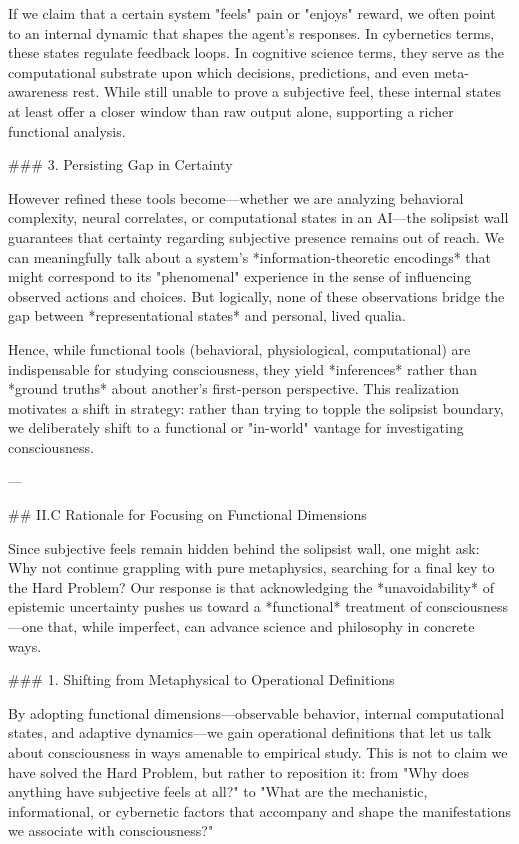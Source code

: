 If we claim that a certain system "feels" pain or "enjoys" reward, we often point to an internal dynamic that shapes the agent's responses. In cybernetics terms, these states regulate feedback loops. In cognitive science terms, they serve as the computational substrate upon which decisions, predictions, and even meta-awareness rest. While still unable to prove a subjective feel, these internal states at least offer a closer window than raw output alone, supporting a richer functional analysis.

### 3. Persisting Gap in Certainty

However refined these tools become—whether we are analyzing behavioral complexity, neural correlates, or computational states in an AI—the solipsist wall guarantees that certainty regarding subjective presence remains out of reach. We can meaningfully talk about a system's *information-theoretic encodings* that might correspond to its "phenomenal" experience in the sense of influencing observed actions and choices. But logically, none of these observations bridge the gap between *representational states* and personal, lived qualia.

Hence, while functional tools (behavioral, physiological, computational) are indispensable for studying consciousness, they yield *inferences* rather than *ground truths* about another's first-person perspective. This realization motivates a shift in strategy: rather than trying to topple the solipsist boundary, we deliberately shift to a functional or "in-world" vantage for investigating consciousness.

---

## II.C Rationale for Focusing on Functional Dimensions

Since subjective feels remain hidden behind the solipsist wall, one might ask: Why not continue grappling with pure metaphysics, searching for a final key to the Hard Problem? Our response is that acknowledging the *unavoidability* of epistemic uncertainty pushes us toward a *functional* treatment of consciousness—one that, while imperfect, can advance science and philosophy in concrete ways.

### 1. Shifting from Metaphysical to Operational Definitions

By adopting functional dimensions—observable behavior, internal computational states, and adaptive dynamics—we gain operational definitions that let us talk about consciousness in ways amenable to empirical study. This is not to claim we have solved the Hard Problem, but rather to reposition it: from "Why does anything have subjective feels at all?" to "What are the mechanistic, informational, or cybernetic factors that accompany and shape the manifestations we associate with consciousness?"

